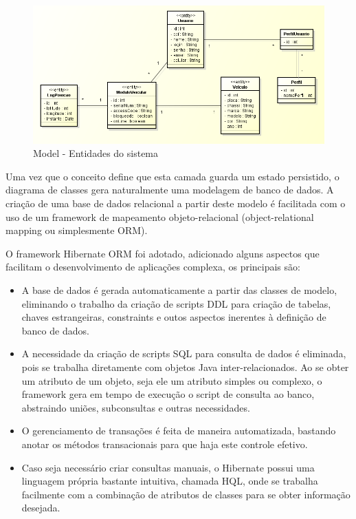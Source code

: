 \begin{figure}[!htb]
	\centering
	\includegraphics[width=\textwidth]{figures/model.png}
	\caption{Model - Entidades do sistema}
	\label{fig:webmanmodel}
\end{figure}

Uma vez que o conceito define que esta camada guarda um estado persistido, o diagrama de classes gera naturalmente uma modelagem de banco de dados. A criação de uma base de dados relacional a partir deste modelo é facilitada com o uso de um framework de mapeamento objeto-relacional (object-relational mapping ou simplesmente ORM).

O framework Hibernate ORM foi adotado, adicionado alguns aspectos que facilitam o desenvolvimento de aplicações complexa, os principais são:

\begin{itemize}
	\item A base de dados é gerada automaticamente a partir das classes de modelo, eliminando o trabalho da criação de scripts DDL para criação de tabelas, chaves estrangeiras, constraints e outos aspectos inerentes à definição de banco de dados.
	\item A necessidade da criação de scripts SQL para consulta de dados é eliminada, pois se trabalha diretamente com objetos Java inter-relacionados. Ao se obter um atributo de um objeto, seja ele um atributo simples ou complexo, o framework gera em tempo de execução o script de consulta ao banco, abstraindo uniões, subconsultas e outras necessidades.
	\item O gerenciamento de transações é feita de maneira automatizada, bastando anotar os métodos transacionais para que haja este controle efetivo.
	\item Caso seja necessário criar consultas manuais, o Hibernate possui uma linguagem própria bastante intuitiva, chamada HQL, onde se trabalha facilmente com a combinação de atributos de classes para se obter informação desejada. 
\end{itemize}

